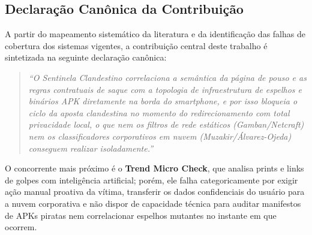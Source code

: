 \subsection{Declara\c{c}\~{a}o Can\^{o}nica da Contribui\c{c}\~{a}o}

A partir do mapeamento sistem\'{a}tico da literatura e da identifica\c{c}\~{a}o das falhas de cobertura dos sistemas vigentes, a contribui\c{c}\~{a}o central deste trabalho \'{e} sintetizada na seguinte declara\c{c}\~{a}o can\^{o}nica:
\begin{quote}
    \textit{``O Sentinela Clandestino correlaciona a sem\^{a}ntica da p\'{a}gina de pouso e as regras contratuais de saque com a topologia de infraestrutura de espelhos e bin\'{a}rios APK diretamente na borda do smartphone, e por isso bloqueia o ciclo da aposta clandestina no momento do redirecionamento com total privacidade local, o que nem os filtros de rede est\'{a}ticos (Gamban/Netcraft) nem os classificadores corporativos em nuvem (Muzakir/{\'A}lvarez-Ojeda) conseguem realizar isoladamente.''}
\end{quote}

O concorrente mais pr\'{o}ximo \'{e} o \textbf{Trend Micro Check}, que analisa prints e links de golpes com intelig\^{e}ncia artificial; por\'{e}m, ele falha categoricamente por exigir a\c{c}\~{a}o manual proativa da v\'{i}tima, transferir os dados confidenciais do usu\'{a}rio para a nuvem corporativa e n\~{a}o dispor de capacidade t\'{e}cnica para auditar manifestos de APKs piratas nem correlacionar espelhos mutantes no instante em que ocorrem.